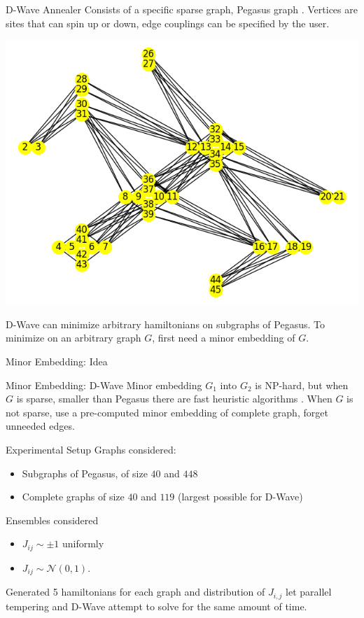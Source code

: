 \documentclass{beamer}
\begin{document}
\begin{frame}{D-Wave Annealer}
	Consists of a specific sparse graph, Pegasus graph \cite{dattani2019pegasus}. Vertices are sites that can spin up or down, edge couplings can be specified by the user. \\
	\begin{center}
	\includegraphics[scale=.3]{Plot.png}
	\end{center}
	D-Wave can minimize arbitrary hamiltonians on subgraphs of Pegasus. To minimize on an arbitrary graph $G$, first need a minor embedding of $G$.
	\end{frame}

\begin{frame}{Minor Embedding: Idea}

	\end{frame}

\begin{frame}{Minor Embedding: D-Wave}
	Minor embedding $G_1$ into $G_2$ is NP-hard, but when $G$ is sparse, smaller than Pegasus there are fast heuristic algorithms \cite{cai2014practical}. When $G$ is not sparse, use a pre-computed minor embedding of complete graph, forget unneeded edges.
\end{frame}

\begin{frame}{Experimental Setup}
	Graphs considered:
	\begin{itemize}
		\item Subgraphs of Pegasus, of size $40$ and $448$ \\
		\item Complete graphs of size $40$ and $119$ (largest possible for D-Wave)
	\end{itemize}
Ensembles considered
\begin{itemize}
 \item $J_{ij} \sim \pm 1$ uniformly
 \item  $J_{ij} \sim \mathcal{N}(0, 1)$.
 \end{itemize} 
Generated 5 hamiltonians for each graph and distribution of $J_{i, j}$ let parallel tempering and D-Wave attempt to solve for the same amount of time.
	\end{frame}
\end{document}
